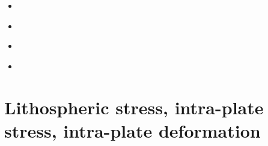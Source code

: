 \begin{scriptsize}
\begin{itemize}
\item[\nineteeneightyseven]
\textcite{kamz87} \\
\item[\twothousandeight]
\textcite{hupc08} \\
\item[\twothousandseventeen]
\textcite{moyu17} \\
\item[\twothousandeighteen]
\textcite{moyu18} \\
\end{itemize}
\end{scriptsize}

\section{Lithospheric stress, intra-plate stress, intra-plate deformation}


